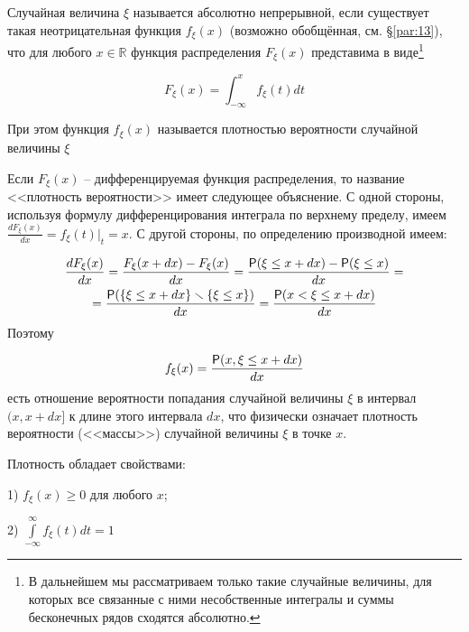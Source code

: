 \begin{definition}
\label{def:12.1}
	Случайная величина $\xi$ называется абсолютно непрерывной, если существует такая неотрицательная функция $f_{\xi} (x)$ (возможно обобщённая, см. \S\ref{par:13}), что для любого $x \in \mathbb{R}$ функция распределения $F_{\xi}(x)$ представима в виде\footnote{В дальнейшем мы рассматриваем только такие случайные величины, для которых все связанные с
ними несобственные интегралы и суммы бесконечных рядов сходятся абсолютно.
	}
  
\begin{equation*}
	F_{\xi}(x)=\int_{-\infty}^{x} f_{\xi}(t) dt  	
\end{equation*}

При этом функция $f_{\xi}(x)$ называется плотностью вероятности случайной величины $\xi$
\end{definition}

\begin{zam}
\label{zam:12.2}
Если $F_{\xi}(x)$ -- дифференцируемая функция распределения, то название <<плотность вероятности>> имеет следующее объяснение. С одной стороны, используя формулу дифференцирования интеграла по верхнему пределу, имеем $\frac{dF_{\xi}(x)}{dx}=f_{\xi}(t)|_t=x$. С другой стороны, по определению производной имеем:

\begin{gather*}
	\frac{dF_{\xi}(x)}{dx} = \frac{F_{\xi}(x+dx)-F_{\xi}(x)}{dx}=\frac{\P(\xi \leq x+dx)-\P(\xi \leq x)}{dx}=\\=\frac{\P(\{\xi \leq x+dx \}\ssm \{\xi \leq x\})}{dx} = \frac{\P(x<\xi \leq x+dx)}{dx}
\end{gather*}
Поэтому

\begin{equation*}
	f_{\xi}(x)=\frac{\P(x,\xi \leq x+dx)}{dx}	 
\end{equation*}
есть отношение вероятности попадания случайной величины $\xi$ в интервал $(x, x+dx]$ к длине этого интервала $dx$, что физически означает плотность вероятности (<<массы>>) случайной величины $\xi$ в точке $x$.
\end{zam}
 

 \begin{theorem}
 \label{th:12.3}
Плотность обладает свойствами:

1) $f_{\xi}(x) \geq 0$ для любого $x$;

2) $\int\limits_{-\infty}^{\infty} f_{\xi}(t)dt=1$
 \end{theorem}

